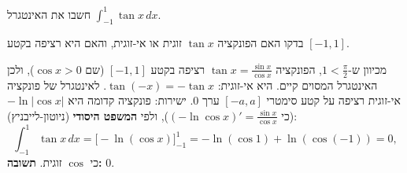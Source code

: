 
\begin{question}
חשבו את האינטגרל $\displaystyle\int_{-1}^{1}\tan x\,dx$.
\end{question}

\begin{hint}
בדקו האם הפונקציה $\tan x$ זוגית או אי-זוגית, והאם היא רציפה בקטע $[-1,1]$.
\end{hint}

\begin{solution}
מכיוון ש-$1<\frac{\pi}{2}$, הפונקציה $\tan x=\frac{\sin x}{\cos x}$ רציפה בקטע $[-1,1]$ (שם $\cos x>0$), ולכן האינטגרל המסוים קיים. היא אי-זוגית: $\tan(-x)=-\tan x$. לאינטגרל של פונקציה אי-זוגית רציפה על קטע סימטרי $[-a,a]$ ערך $0$. ישירות: פונקציה קדומה היא $-\ln|\cos x|$ (כי $(-\ln\cos x)'=\frac{\sin x}{\cos x}$), ולפי \textbf{המשפט היסודי} (ניוטון-לייבניץ):
\[ \int_{-1}^{1}\tan x\,dx=\Big[-\ln(\cos x)\Big]_{-1}^{1}=-\ln(\cos 1)+\ln(\cos(-1))=0, \]
כי $\cos$ זוגית. \textbf{תשובה:} $0$.
\end{solution}

